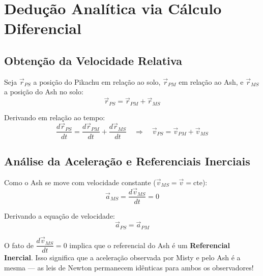 \documentclass[10.5pt, a4paper]{extarticle}
\begin{document}
\section{Dedução Analítica via Cálculo Diferencial}

\subsection{Obtenção da Velocidade Relativa}

Seja $\vec{r}_{PS}$ a posição do Pikachu em relação ao solo, $\vec{r}_{PM}$ em relação ao Ash, e $\vec{r}_{MS}$ a posição do Ash no solo:
\[
  \vec{r}_{PS} = \vec{r}_{PM} + \vec{r}_{MS}
\]

Derivando em relação ao tempo:
\[
  \frac{d\vec{r}_{PS}}{dt} = \frac{d\vec{r}_{PM}}{dt} + \frac{d\vec{r}_{MS}}{dt}
  \quad\Rightarrow\quad
  \vec{v}_{PS} = \vec{v}_{PM} + \vec{v}_{MS}
\]

\subsection{Análise da Aceleração e Referenciais Inerciais}

Como o Ash se move com velocidade constante ($\vec{v}_{MS} = \vec{v} = \text{cte}$):
\[
  \vec{a}_{MS} = \frac{d\vec{v}_{MS}}{dt} = 0
\]

Derivando a equação de velocidade:
\[
  \vec{a}_{PS} = \vec{a}_{PM}
\]

\begin{squirtlebox}
O fato de $\dfrac{d\vec{v}_{MS}}{dt} = 0$ implica que o referencial do Ash é um \textbf{Referencial Inercial}. Isso significa que a aceleração observada por Misty e pelo Ash é a mesma — as leis de Newton permanecem idênticas para ambos os observadores!
\end{squirtlebox}

\begin{center}
\end{center}
\end{document}
